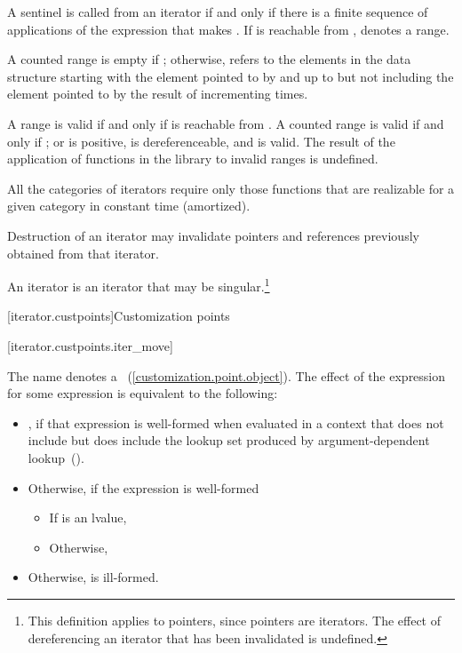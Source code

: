 \pnum
A sentinel
is called
from an iterator
if and only if there is a finite sequence of applications of
the expression
that makes
.
If
is reachable from
,
 denotes a range.

\pnum
A counted range  is empty if ; otherwise, 
refers to the  elements in the data structure starting with the element
pointed to by  and up to but not including the element pointed to by the
result of incrementing   times.

\pnum
A range 
is valid if and only if
is reachable from
.
A counted range  is valid if and only if ; or 
is positive,  is dereferenceable, and  is valid.
The result of the application of functions in the library to invalid ranges is
undefined.

\pnum
All the categories of iterators require only those functions that are realizable for a given category in
constant time (amortized).

\pnum
Destruction of an iterator may invalidate pointers and references
previously obtained from that iterator.

\pnum
An
iterator is an iterator that may be singular.\footnote{This definition applies to pointers, since pointers are iterators.
The effect of dereferencing an iterator that has been invalidated
is undefined.
}

[iterator.custpoints]{Customization points}

[iterator.custpoints.iter_move]{}

\pnum
The name  denotes a ~(\ref{customization.point.object}). The effect of the expression
 for some expression  is equivalent to the
following:

\begin{itemize}
\item {}, if that expression is well-formed when evaluated in
a context that does not include  but does include the
lookup set produced by argument-dependent lookup~().
\item Otherwise, if the expression  is well-formed
\begin{itemize}
\item If  is an lvalue, 
\item Otherwise, 
\end{itemize}
\item Otherwise,  is ill-formed.
\end{itemize}


